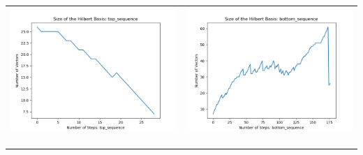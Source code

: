 \documentclass[10pt]{article}
\begin{document}
\begin{tabular}{c|c}
\begin{minipage}{.4\textwidth}
\includegraphics[width=\textwidth]{"DATA/5d/5 generators 2 bound C/top_sequence SIZE"}
\end{minipage} &
\begin{minipage}{.4\textwidth}
\includegraphics[width=\textwidth]{"DATA/5d/5 generators 2 bound C bottomup/bottom_sequence SIZE"}
\end{minipage} \\ \\
\hline \\\begin{minipage}{.4\textwidth}

\end{minipage}
\end{tabular}
\end{document}
